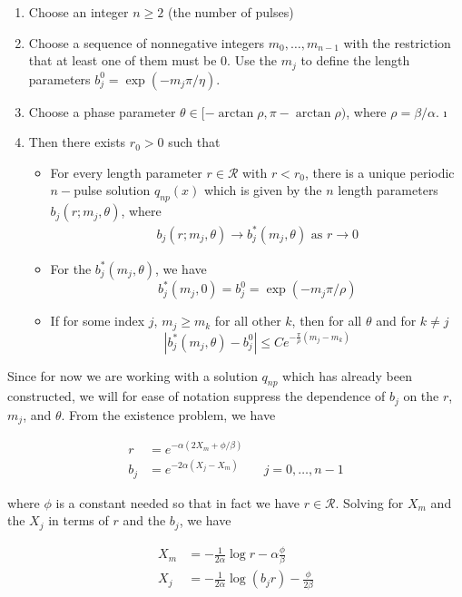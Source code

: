 \documentclass[12pt]{article}
\begin{document}
\begin{enumerate}
	\item Choose an integer $n \geq 2$ (the number of pulses) 
	\item Choose a sequence of nonnegative integers $m_0, \dots, m_{n-1}$ with the restriction that at least one of them must be 0. Use the $m_j$ to define the length parameters $b_j^0 = \exp(-m_j \pi / \eta )$.
	\item Choose a phase parameter $\theta \in [-\arctan \rho, \pi - \arctan \rho)$, where $\rho = \beta / \alpha$.
	\i 
	\item Then there exists $r_0 > 0$ such that 
		\begin{itemize}
		\item For every length parameter $r \in \mathcal{R}$ with $r < r_0$, there is a unique periodic $n-$pulse solution $q_{np}(x)$ which is given by the $n$ length parameters $b_j(r; m_j, \theta)$, where
		\begin{align*}
		b_j(r; m_j, \theta) \rightarrow b^*_j(m_j, \theta) \text{ as }
		r \rightarrow 0
		\end{align*}
		\item For the $b^*_j(m_j, \theta)$, we have
		\[
		b^*_j(m_j, 0) = b_j^0 = \exp(-m_j \pi / \rho )
		\]
		\item If for some index $j$, $m_j \geq m_k$ for all other $k$, then for all $\theta$ and for $k \neq j$
		\[
		|b^*_j(m_j, \theta) - b_j^0| \leq C e^{ -\frac{\pi}{\rho} (m_j - m_k) }
		\]
		\end{itemize}
\end{enumerate} 

Since for now we are working with a solution $q_{np}$ which has already been constructed, we will for ease of notation suppress the dependence of $b_j$ on the $r$, $m_j$, and $\theta$. From the existence problem, we have

\begin{align}
r &= e^{-\alpha(2 X_m + \phi/\beta)} \\
b_j &= e^{-2 \alpha(X_j - X_m)} && j = 0, \dots, n-1
\end{align}

where $\phi$ is a constant needed so that in fact we have $r \in \mathcal{R}$.
Solving for $X_m$ and the $X_j$ in terms of $r$ and the $b_j$, we have

\begin{align*}
X_m &= -\frac{1}{2\alpha}\log r - \alpha \frac{\phi}{\beta} \\
X_j &= -\frac{1}{2\alpha}\log(b_j r) - \frac{\phi}{2 \beta} 
\end{align*}
\end{document}
